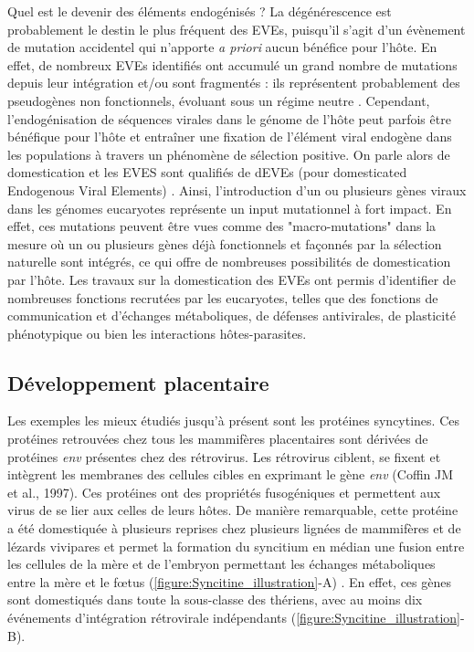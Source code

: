 Quel est le devenir des éléments endogénisés ? La dégénérescence est probablement le destin le plus fréquent des EVEs, puisqu'il s'agit d'un évènement de mutation accidentel qui n'apporte \textit{a priori} aucun bénéfice pour l'hôte. En effet, de nombreux EVEs identifiés ont accumulé un grand nombre de mutations depuis leur intégration et/ou sont fragmentés : ils représentent probablement des pseudogènes non fonctionnels, évoluant sous un régime neutre \citep{katzourakis_endogenous_2010}. Cependant, l'endogénisation de séquences virales dans le génome de l'hôte peut parfois être bénéfique pour l'hôte et entraîner une fixation de l'élément viral endogène dans les populations à travers un phénomène de sélection positive.  On parle alors de domestication et les EVES sont qualifiés de dEVEs (pour domesticated Endogenous Viral Elements) \citep{koonin_depths_2018}. Ainsi, l'introduction d'un ou plusieurs gènes viraux dans les génomes eucaryotes représente un input mutationnel à fort impact. En effet, ces mutations peuvent être vues comme des "macro-mutations" dans la mesure où un ou plusieurs gènes déjà fonctionnels et façonnés par la sélection naturelle sont intégrés, ce qui offre de nombreuses possibilités de domestication par l'hôte. Les travaux sur la domestication des EVEs ont permis d'identifier de nombreuses fonctions recrutées par les eucaryotes, telles que des fonctions de communication et d'échanges métaboliques, de défenses antivirales, de plasticité phénotypique ou bien les interactions hôtes-parasites. 

\subsection{Développement placentaire}

Les exemples les mieux étudiés jusqu'à présent sont les protéines syncytines. Ces protéines retrouvées chez tous les mammifères placentaires sont dérivées de protéines \textit{env} présentes chez des rétrovirus. Les rétrovirus ciblent, se fixent et intègrent les membranes des cellules cibles en exprimant le gène \textit{env} (Coffin JM et al., 1997). Ces protéines ont des propriétés fusogéniques et permettent aux virus de se lier aux celles de leurs hôtes. De manière remarquable, cette protéine a été domestiquée à plusieurs reprises chez plusieurs lignées de mammifères et de lézards vivipares et permet la formation du syncitium en médian une fusion entre les cellules de la mère et de l'embryon permettant les échanges métaboliques entre la mère et le fœtus (\figurename{\ref{figure:Syncitine_illustration}}-A) \citep{lavialle_paleovirology_2013,cornelis_endogenous_2017}. En effet, ces gènes sont domestiqués dans toute la sous-classe des thériens, avec au moins dix événements d'intégration rétrovirale indépendants \citep{imakawa_baton_2015}(\figurename{\ref{figure:Syncitine_illustration}}-B).\\

